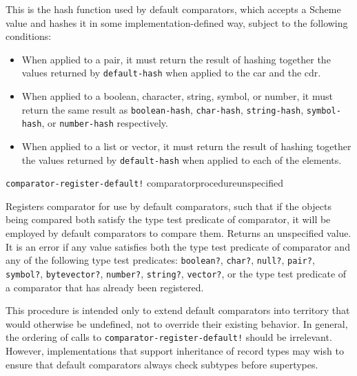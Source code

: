 \begin{entry}{%
  }

  This is the hash function used by default comparators, which accepts
  a Scheme value and hashes it in some implementation-defined way,
  subject to the following conditions:

\begin{itemize}
  \tightlist
\item When applied to a pair, it must return the result of hashing
  together the values returned by \texttt{default-hash} when applied
  to the car and the cdr.
\item When applied to a boolean, character, string, symbol, or number,
  it must return the same result as \texttt{boolean-hash},
  \texttt{char-hash}, \texttt{string-hash}, \texttt{symbol-hash}, or
  \texttt{number-hash} respectively.
\item When applied to a list or vector, it must return the result of
  hashing together the values returned by \texttt{default-hash} when
  applied to each of the elements.
\end{itemize}
\end{entry}

\begin{entry}{%
  \texttt{comparator-register-default!}{ comparator}{procedure}{unspecified}}

  Registers comparator for use by default comparators, such that if
  the objects being compared both satisfy the type test predicate of
  comparator, it will be employed by default comparators to compare
  them.  Returns an unspecified value. It is an error if any value
  satisfies both the type test predicate of comparator and any of the
  following type test predicates: \texttt{boolean?}, \texttt{char?},
  \texttt{null?}, \texttt{pair?}, \texttt{symbol?},
  \texttt{bytevector?}, \texttt{number?}, \texttt{string?},
  \texttt{vector?}, or the type test predicate of a comparator that
  has already been registered.

  This procedure is intended only to extend default comparators into
  territory that would otherwise be undefined, not to override their
  existing behavior. In general, the ordering of calls to
  \texttt{comparator-register-default!} should be irrelevant. However,
  implementations that support inheritance of record types may wish to
  ensure that default comparators always check subtypes before
  supertypes.
\end{entry}

